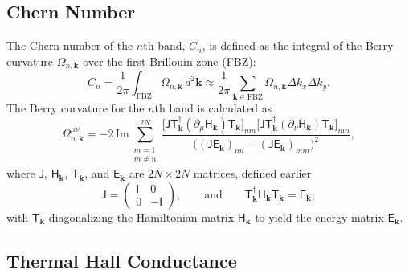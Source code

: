 \documentclass[aps, prx, nofootinbib, superscriptaddress]{revtex4-2}
\newcommand{\kvec}{\mathbf{k}}
\begin{document}
\subsection{Chern Number}\label{subsec: Chern number}

The Chern number of the $n$th band, $C_n$, is defined as the integral of the Berry curvature $\Omega_{n, \kvec}$ over the first Brillouin zone (FBZ):
\begin{equation}
    C_n = \frac{1}{2\pi} \int_{\text{FBZ}} \Omega_{n, \kvec} \, d^2\mathbf{k} 
    \approx \frac{1}{2\pi} \sum_{\kvec \in \text{FBZ}} \Omega_{n, \kvec} \Delta k_x \Delta k_y.
\end{equation}
The Berry curvature for the $n$th band is calculated as
\begin{equation}
    \Omega_{n, \kvec}^{\mu\nu} = 
    - 2 \, \mathrm{Im} \sum_{\substack{m = 1 \\ m \neq n}}^{2N}
    \frac{
        \big[ \mathsf{J} \mathsf{T}^{\dagger}_{\kvec} (\partial_{\mu} \mathsf{H}_{\kvec}) \mathsf{T}_{\kvec} \big]_{nm}
        \big[ \mathsf{J} \mathsf{T}^{\dagger}_{\kvec} (\partial_{\nu} \mathsf{H}_{\kvec}) \mathsf{T}_{\kvec} \big]_{mn}
    }{\big( (\mathsf{J} \mathsf{E}_{\kvec})_{nn} - (\mathsf{J} \mathsf{E}_{\kvec})_{mm} \big)^2},
\end{equation}
where $\mathsf{J}$, $\mathsf{H}_{\kvec}$, $\mathsf{T}_{\kvec}$, and $\mathsf{E}_{\kvec}$ are $2N \times 2N$ matrices, defined earlier
\begin{equation}
    \mathsf{J} = 
    \begin{pmatrix}
        \mathsf{I} & 0 \\ 0 & -\mathsf{I}
    \end{pmatrix}, 
    \qquad \text{and} \qquad
    \mathsf{T}^{\dagger}_{\kvec} \mathsf{H}_{\kvec} \mathsf{T}_{\kvec} = \mathsf{E}_{\kvec},
\end{equation}
with $\mathsf{T}_{\kvec}$ diagonalizing the Hamiltonian matrix $\mathsf{H}_{\kvec}$ to yield the energy matrix $\mathsf{E}_{\kvec}$.




\subsection{Thermal Hall Conductance}\label{subsec: Thermal Hall Conductance}
\end{document}
